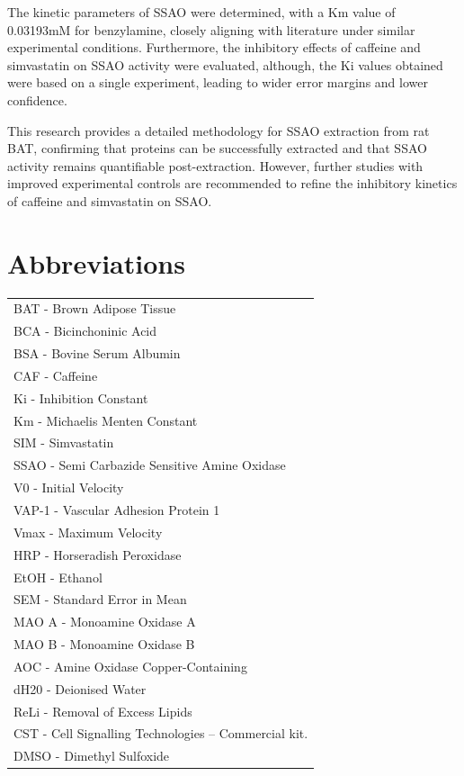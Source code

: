 \documentclass[
  letterpaper,
  DIV=11,
  numbers=noendperiod]{scrreprt}
\begin{document}
The kinetic parameters of SSAO were determined, with a Km value of
0.03193mM for benzylamine, closely aligning with literature under
similar experimental conditions. Furthermore, the inhibitory effects of
caffeine and simvastatin on SSAO activity were evaluated, although, the
Ki values obtained were based on a single experiment, leading to wider
error margins and lower confidence.

This research provides a detailed methodology for SSAO extraction from
rat BAT, confirming that proteins can be successfully extracted and that
SSAO activity remains quantifiable post-extraction. However, further
studies with improved experimental controls are recommended to refine
the inhibitory kinetics of caffeine and simvastatin on SSAO.

\section*{\texorpdfstring{\textbf{Abbreviations}}{Abbreviations}}\label{abbreviations}


\begin{longtable}[]{@{}l@{}}
\toprule\noalign{}
\endhead
\bottomrule\noalign{}
\endlastfoot
BAT - Brown Adipose Tissue \\
BCA - Bicinchoninic Acid \\
BSA - Bovine Serum Albumin \\
CAF - Caffeine \\
Ki - Inhibition Constant \\
Km - Michaelis Menten Constant \\
SIM - Simvastatin \\
SSAO - Semi Carbazide Sensitive Amine Oxidase \\
V0 - Initial Velocity \\
VAP-1 - Vascular Adhesion Protein 1 \\
Vmax - Maximum Velocity \\
HRP - Horseradish Peroxidase \\
EtOH - Ethanol \\
SEM - Standard Error in Mean \\
MAO A - Monoamine Oxidase A \\
MAO B - Monoamine Oxidase B \\
AOC - Amine Oxidase Copper-Containing \\
dH20 - Deionised Water \\
ReLi - Removal of Excess Lipids \\
CST - Cell Signalling Technologies -- Commercial kit. \\
DMSO - Dimethyl Sulfoxide \\
\end{longtable}
\end{document}
